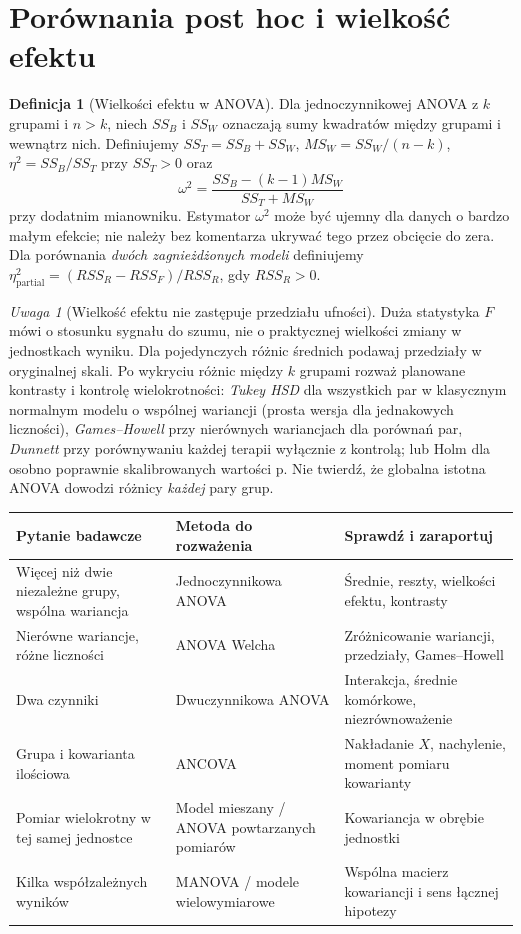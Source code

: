 \documentclass[11pt,a4paper,oneside]{report}
\numberwithin{equation}{chapter}
\theoremstyle{plain}
\theoremstyle{definition}
\newtheorem{definicja}{Definicja}[chapter]
\theoremstyle{remark}
\newtheorem{uwaga}{Uwaga}[chapter]
\begin{document}
\section{Porównania post hoc i wielkość efektu}
\begin{definicja}[Wielkości efektu w ANOVA]\label{def:anova-effectsize}
Dla jednoczynnikowej ANOVA z $k$ grupami i $n>k$, niech $SS_B$ i $SS_W$ oznaczają sumy kwadratów między grupami i wewnątrz nich. Definiujemy $SS_T=SS_B+SS_W$, $MS_W=SS_W/(n-k)$, $\eta^2=SS_B/SS_T$ przy $SS_T>0$ oraz
\[
 \omega^2=\frac{SS_B-(k-1)MS_W}{SS_T+MS_W}
\]
przy dodatnim mianowniku. Estymator $\omega^2$ może być ujemny dla danych o bardzo małym efekcie; nie należy bez komentarza ukrywać tego przez obcięcie do zera. Dla porównania \emph{dwóch zagnieżdżonych modeli} definiujemy $\eta_{\mathrm{partial}}^2=(RSS_R-RSS_F)/RSS_R$, gdy $RSS_R>0$.
\end{definicja}

\begin{uwaga}[Wielkość efektu nie zastępuje przedziału ufności]
Duża statystyka $F$ mówi o stosunku sygnału do szumu, nie o praktycznej wielkości zmiany w jednostkach wyniku. Dla pojedynczych różnic średnich podawaj przedziały w oryginalnej skali. Po wykryciu różnic między $k$ grupami rozważ planowane kontrasty i kontrolę wielokrotności: \emph{Tukey HSD} dla wszystkich par w klasycznym normalnym modelu o wspólnej wariancji (prosta wersja dla jednakowych liczności), \emph{Games--Howell} przy nierównych wariancjach dla porównań par, \emph{Dunnett} przy porównywaniu każdej terapii wyłącznie z kontrolą; lub Holm dla osobno poprawnie skalibrowanych wartości p. Nie twierdź, że globalna istotna ANOVA dowodzi różnicy \emph{każdej} pary grup.
\end{uwaga}

\begin{center}\small
\begin{tabular}{>{\raggedright\arraybackslash}p{}>{\raggedright\arraybackslash}p{}>{\raggedright\arraybackslash}p{}}
\toprule
\textbf{Pytanie badawcze} & \textbf{Metoda do rozważenia} & \textbf{Sprawdź i zaraportuj}\\
\midrule
Więcej niż dwie niezależne grupy, wspólna wariancja & Jednoczynnikowa ANOVA & Średnie, reszty, wielkości efektu, kontrasty\\
Nierówne wariancje, różne liczności & ANOVA Welcha & Zróżnicowanie wariancji, przedziały, Games--Howell\\
Dwa czynniki & Dwuczynnikowa ANOVA & Interakcja, średnie komórkowe, niezrównoważenie\\
Grupa i kowarianta ilościowa & ANCOVA & Nakładanie $X$, nachylenie, moment pomiaru kowarianty\\
Pomiar wielokrotny w tej samej jednostce & Model mieszany / ANOVA powtarzanych pomiarów & Kowariancja w obrębie jednostki\\
Kilka współzależnych wyników & MANOVA / modele wielowymiarowe & Wspólna macierz kowariancji i sens łącznej hipotezy\\
\bottomrule
\end{tabular}
\end{center}
\end{document}
